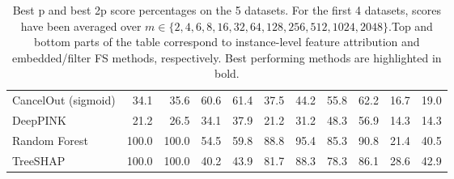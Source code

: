 \begin{table}[h!]
{{\begin{tabular}{lrrrrrrrrrr}
CancelOut (sigmoid) & 34.1 & 35.6 & 60.6 & 61.4 & 37.5 & 44.2 & 55.8 & 62.2 & 16.7 & 19.0 \\
DeepPINK & 21.2 & 26.5 & 34.1 & 37.9 & 21.2 & 31.2 & 48.3 & 56.9 & 14.3 & 14.3 \\
Random Forest & 100.0 & 100.0 & 54.5 & 59.8 & 88.8 & 95.4 & 85.3 & 90.8 & 21.4 & 40.5 \\
TreeSHAP & 100.0 & 100.0 & 40.2 & 43.9 & 81.7 & 88.3 & 78.3 & 86.1 & 28.6 & 42.9 \\
\bottomrule
\end{tabular}}}{}
\caption{Best p and best 2p score percentages on the 5 datasets. For the first 4 datasets, scores have been averaged over $m \in \{2, 4, 6, 8, 16, 32, 64, 128, 256, 512, 1024, 2048\}$.Top and bottom parts of the table correspond to instance-level feature attribution and embedded/filter FS methods, respectively. Best performing methods are highlighted in bold.}
\end{table}
